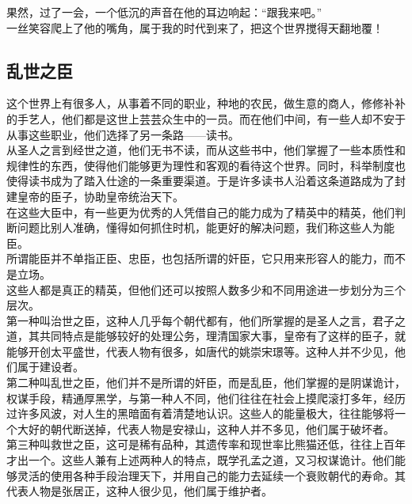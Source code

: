 \begin{multicols}{\theparacolNo}
果然，过了一会，一个低沉的声音在他的耳边响起：“跟我来吧。”\\

一丝笑容爬上了他的嘴角，属于我的时代到来了，把这个世界搅得天翻地覆！\\

\subsection{乱世之臣}
这个世界上有很多人，从事着不同的职业，种地的农民，做生意的商人，修修补补的手艺人，他们都是这世上芸芸众生中的一员。而在他们中间，有一些人却不安于从事这些职业，他们选择了另一条路——读书。\\

从圣人之言到经世之道，他们无书不读，而从这些书中，他们掌握了一些本质性和规律性的东西，使得他们能够更为理性和客观的看待这个世界。同时，科举制度也使得读书成为了踏入仕途的一条重要渠道。于是许多读书人沿着这条道路成为了封建皇帝的臣子，协助皇帝统治天下。\\

在这些大臣中，有一些更为优秀的人凭借自己的能力成为了精英中的精英，他们判断问题比别人准确，懂得如何抓住时机，能更好的解决问题，我们称这些人为能臣。\\

所谓能臣并不单指正臣、忠臣，也包括所谓的奸臣，它只用来形容人的能力，而不是立场。\\

这些人都是真正的精英，但他们还可以按照人数多少和不同用途进一步划分为三个层次。\\

第一种叫治世之臣，这种人几乎每个朝代都有，他们所掌握的是圣人之言，君子之道，其共同特点是能够较好的处理公务，理清国家大事，皇帝有了这样的臣子，就能够开创太平盛世，代表人物有很多，如唐代的姚崇宋璟等。这种人并不少见，他们属于建设者。\\

第二种叫乱世之臣，他们并不是所谓的奸臣，而是乱臣，他们掌握的是阴谋诡计，权谋手段，精通厚黑学，与第一种人不同，他们往往在社会上摸爬滚打多年，经历过许多风波，对人生的黑暗面有着清楚地认识。这些人的能量极大，往往能够将一个大好的朝代断送掉，代表人物是安禄山，这种人并不多见，他们属于破坏者。\\

第三种叫救世之臣，这可是稀有品种，其遗传率和现世率比熊猫还低，往往上百年才出一个。这些人兼有上述两种人的特点，既学孔孟之道，又习权谋诡计。他们能够灵活的使用各种手段治理天下，并用自己的能力去延续一个衰败朝代的寿命。其代表人物是张居正，这种人很少见，他们属于维护者。\\


\end{multicols}
